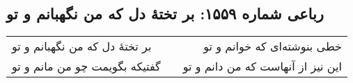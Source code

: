 \begin{center}
\section*{رباعی شماره ۱۵۵۹: بر تختهٔ دل که من نگهبانم و تو}
\label{sec:1559}
\begin{longtable}{l p{0.5cm} r}
بر تختهٔ دل که من نگهبانم و تو
&&
خطی بنوشته‌ای که خوانم و تو
\\
گفتیکه بگویمت چو من مانم و تو
&&
این نیز از آنهاست که من دانم و تو
\\
\end{longtable}
\end{center}
